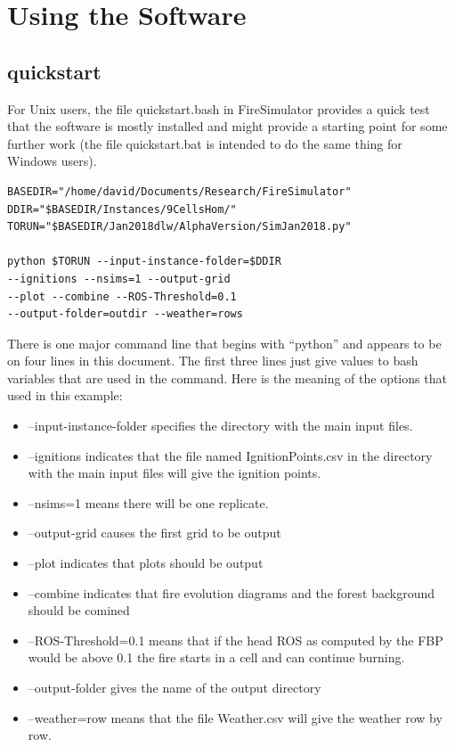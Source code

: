 \documentclass[11pt]{article}
\begin{document}
\appendix

\section{Using the Software}

\subsection{quickstart}

For Unix users, the file quickstart.bash in FireSimulator provides a quick test
that the software is mostly installed and might provide a starting point
for some further work (the file quickstart.bat is intended to do the same
thing for Windows users).

\begin{verbatim}
BASEDIR="/home/david/Documents/Research/FireSimulator"
DDIR="$BASEDIR/Instances/9CellsHom/"
TORUN="$BASEDIR/Jan2018dlw/AlphaVersion/SimJan2018.py"

python $TORUN --input-instance-folder=$DDIR 
--ignitions --nsims=1 --output-grid 
--plot --combine --ROS-Threshold=0.1 
--output-folder=outdir --weather=rows
\end{verbatim}

There is one major command line that begins with ``python'' and appears to be on four
lines in this document. The first three lines just give values to bash variables
that are used in the command. Here is the meaning of the options
that used in this example:
\begin{itemize}
\item --input-instance-folder specifies the directory with the main input files.
  \item --ignitions indicates that the file named IgnitionPoints.csv in the directory with the main input files will give the ignition points.
  \item --nsims=1 means there will be one replicate. 
  \item --output-grid causes the first grid to be output
\item --plot indicates that plots should be output
    \item --combine indicates that fire evolution diagrams and the forest background should be comined
    \item --ROS-Threshold=0.1 means that if the head ROS as computed by the FBP would be above 0.1 the fire starts in a cell and can continue burning.
      \item --output-folder gives the name of the output directory
  \item --weather=row means that the file Weather.csv will give the weather row by row. 
\end{itemize}
\end{document}
